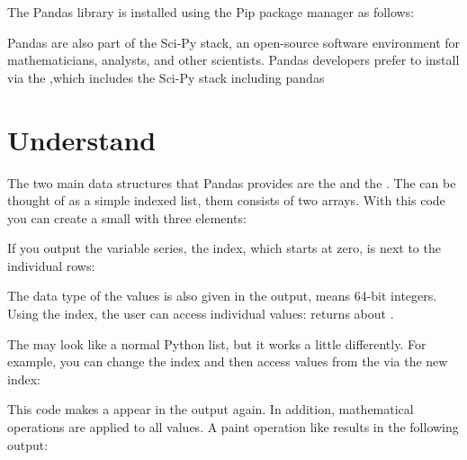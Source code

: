 The Pandas library is installed using the Pip package manager as follows:


Pandas are also part of the Sci-Py stack, an open-source software environment for mathematicians, analysts, and other scientists. Pandas developers prefer to install via the 
,which includes the Sci-Py stack including pandas


\section{Understand }

The two main data structures that Pandas provides are the  and the . The  can be thought of as a simple indexed list, them consists of two arrays. With this code you can create a small  with three elements:

\medskip


If you output the variable series, the index, which starts at zero, is next to the individual rows:





\medskip
The data type of the values is also given in the output,  means 64-bit integers. Using the index, the user can access individual values:  returns about .

The  may look like a normal Python list, but it works a little differently. For example, you can change the index and then access values from the  via the new index:





\medskip
{}


\medskip

This code makes a appear in the output again. In addition, mathematical operations are applied to all  values. A paint operation like  results in the following output:

